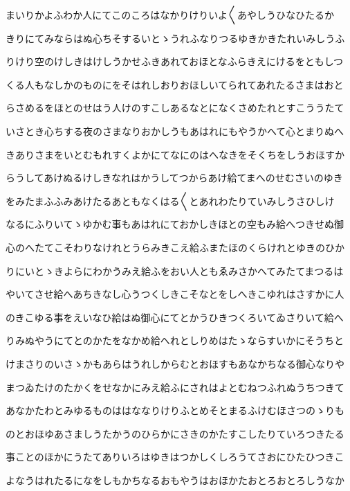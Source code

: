 \documentclass[a4paper,11pt,landscape]{ltjtarticle}
\begin{document}
まいりかよふわか人にてこのころはなかりけりいよ〱あやしうひなひたるか
\par\medskip
きりにてみならはぬ心ちそするいとゝうれふなりつるゆきかきたれいみしうふ
\par\medskip
りけり空のけしきはけしうかせふきあれておほとなふらきえにけるをともしつ
\par\medskip
くる人もなしかのものにをそはれしおりおほしいてられてあれたるさまはおと
\par\medskip
らさめるをほとのせはう人けのすこしあるなとになくさめたれとすこううたて
\par\medskip
いさとき心ちする夜のさまなりおかしうもあはれにもやうかへて心とまりぬへ
\par\medskip
きありさまをいとむもれすくよかにてなにのはへなきをそくちをしうおほすか
\par\medskip
らうしてあけぬるけしきなれはかうしてつからあけ給てまへのせむさいのゆき
\par\medskip
をみたまふふみあけたるあともなくはる〱とあれわたりていみしうさひしけ
\par\medskip
なるにふりいてゝゆかむ事もあはれにておかしきほとの空もみ給へつきせぬ御
\par\medskip
心のへたてこそわりなけれとうらみきこえ給ふまたほのくらけれとゆきのひか
\par\medskip
りにいとゝきよらにわかうみえ給ふをおい人ともゑみさかへてみたてまつるは
\par\medskip
やいてさせ給へあちきなし心うつくしきこそなとをしへきこゆれはさすかに人
\par\medskip
のきこゆる事をえいなひ給はぬ御心にてとかうひきつくろいてゐさりいて給へ
\par\medskip
りみぬやうにてとのかたをなかめ給へれとしりめはたゝならすいかにそうちと
\par\medskip
けまさりのいさゝかもあらはうれしからむとおほすもあなかちなる御心なりや
\par\medskip
まつゐたけのたかくをせなかにみえ給ふにされはよとむねつふれぬうちつきて
\par\medskip
あなかたわとみゆるものははななりけりふとめそとまるふけむほさつのゝりも
\par\medskip
のとおほゆあさましうたかうのひらかにさきのかたすこしたりていろつきたる
\par\medskip
事ことのほかにうたてありいろはゆきはつかしくしろうてさおにひたひつきこ
\par\medskip
よなうはれたるになをしもかちなるおもやうはおほかたおとろおとろしうなか
\par\medskip
\end{document}
